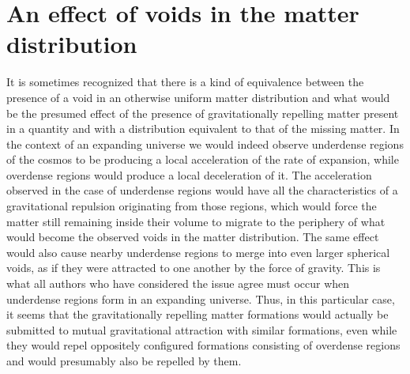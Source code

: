 \documentclass[notitlepage,12pt]{report}
\begin{document}
\section{An effect of voids in the matter distribution}

It is sometimes recognized that there is a kind of equivalence between the presence of a void in an otherwise uniform matter distribution and what would be the presumed effect of the presence of gravitationally repelling matter present in a quantity and with a distribution equivalent to that of the missing matter. In the context of an expanding universe we would indeed observe underdense regions of the cosmos to be producing a local acceleration of the rate of expansion, while overdense regions would produce a local deceleration of it. The acceleration observed in the case of underdense regions would have all the characteristics of a gravitational repulsion originating from those regions, which would force the matter still remaining inside their volume to migrate to the periphery of what would become the observed voids in the matter distribution. The same effect would also cause nearby underdense regions to merge into even larger spherical voids, as if they were attracted to one another by the force of gravity. This is what all authors who have considered the issue agree must occur when underdense regions form in an expanding universe. Thus, in this particular case, it seems that the gravitationally repelling matter formations would actually be submitted to mutual gravitational attraction with similar formations, even while they would repel oppositely configured formations consisting of overdense regions and would presumably also be repelled by them.
\end{document}

